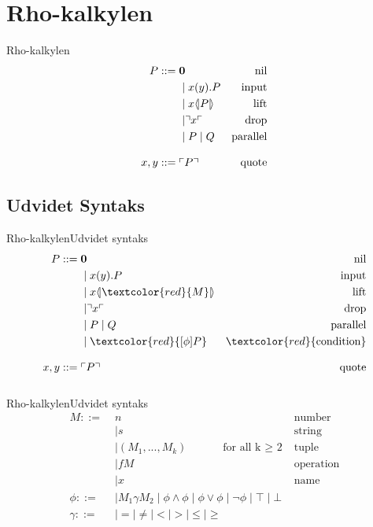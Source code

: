 \section{Rho-kalkylen}
\begin{frame}{Rho-kalkylen}
\begin{align*}
P  ::= \; &  \mathbf{0} & \text{nil} \\
& \mid x(y).P & \text{input} \\
& \mid x \langle \! | P | \! \rangle & \text{lift} \\
& \mid \urcorner x \ulcorner & \text{drop} \\
& \mid P \mid Q & \text{parallel} \\[3mm]
x,y ::= \; & \ulcorner P \urcorner & \text{quote}\\
\end{align*}
\end{frame}

\subsection{Udvidet Syntaks}
\begin{frame}{Rho-kalkylen}{Udvidet syntaks}
\begin{align*}
P  ::= \; &  \nil & \text{nil} \\
& \mid \inp{x}{y}P & \text{input} \\
& \mid \lift{x}{\textcolor{red}{M}}&\text{lift}\\
& \mid \drop{x} & \text{drop} \\
& \mid P \para Q & \text{parallel} \\
& \mid \textcolor{red}{[\phi] P} & \textcolor{red}{\text{condition}} \\[3mm]
x,y ::= \; & \quot{P} & \text{quote}\\[3mm]
\end{align*}
\end{frame}

\begin{frame}{Rho-kalkylen}{Udvidet syntaks}
	\begin{align*}
	M::=\; & n &\text{number}\\
	&\mid s &\text{string}\\
	&\mid (M_1,...,M_k)\quad\quad\quad \text{for all k $\geq$ 2} &\text{tuple}\\
	&\mid fM &\text{operation}\\
	&\mid x &\text{name}\\[3mm]
	\phi ::=& \mid M_1\gamma M_2 \mid \phi\land\phi \mid \phi\lor\phi \mid \neg\phi \mid \top \mid \bot\\[3mm]
	\gamma ::=& \mid = \mid \neq \mid < \mid > \mid \leq \mid \geq
	\end{align*}
\end{frame}